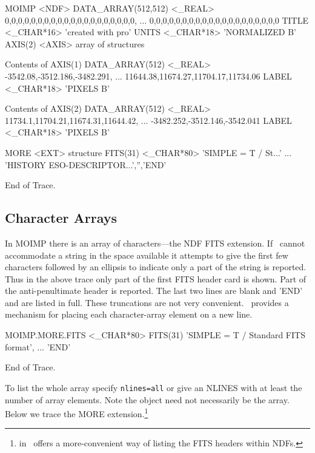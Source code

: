 \documentclass[11pt,nolof]{starlink}
\begin{document}
\small
\begin{terminalv}

MOIMP  <NDF>
  DATA_ARRAY(512,512)  <_REAL>   0,0,0,0,0,0,0,0,0,0,0,0,0,0,0,0,0,0,0,0,
                                 ... 0,0,0,0,0,0,0,0,0,0,0,0,0,0,0,0,0,0,0,0
  TITLE          <_CHAR*16>      'created with pro'
  UNITS          <_CHAR*18>      'NORMALIZED       B'
  AXIS(2)        <AXIS>          {array of structures}

  Contents of AXIS(1)
     DATA_ARRAY(512)  <_REAL>       -3542.08,-3512.186,-3482.291,
                                    ... 11644.38,11674.27,11704.17,11734.06
     LABEL          <_CHAR*18>      'PIXELS           B'

  Contents of AXIS(2)
     DATA_ARRAY(512)  <_REAL>       11734.1,11704.21,11674.31,11644.42,
                                    ... -3482.252,-3512.146,-3542.041
     LABEL          <_CHAR*18>      'PIXELS           B'

  MORE           <EXT>           {structure}
     FITS(31)       <_CHAR*80>      'SIMPLE  =                    T / St...'
                                    ... 'HISTORY  ESO-DESCRIPTOR...','','END'

End of Trace.
\end{terminalv}
\normalsize

\subsection{Character Arrays}

In MOIMP there is an array of characters---the NDF FITS extension. If
\HDSTRACE\ cannot accommodate a string in the space
available it attempts to give the first few characters followed by an
ellipsis to indicate only a part of the string is reported.  Thus in the
above trace only part of the first FITS header card is shown.  Part of
the anti-penultimate header is reported.  The last two lines are blank
and 'END' and are listed in full.  These truncations are not very
convenient. \HDSTRACE\ provides a mechanism for placing
each character-array element on a new line.

\small
\begin{terminalv}

MOIMP.MORE.FITS  <_CHAR*80>
  FITS(31)
   'SIMPLE  =                    T / Standard FITS format', ...
   'END'

End of Trace.
\end{terminalv}
\normalsize
To list the whole array specify \texttt{nlines=all} or give an NLINES with at
least the number of array elements.  Note the object need not
necessarily be the array.  Below we trace the MORE extension.\footnote{
 in \KAPPAref\ offers a more-convenient
way of listing the FITS headers within NDFs.}
\end{document}
